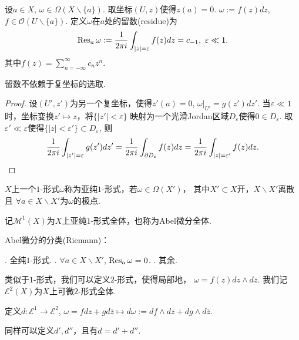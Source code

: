 \begin{definition}
	设$a\in X$, $\omega\in \Omega(X\backslash \{a\})$. 
    取坐标$(U,z)$使得$z(a)=0$. 
    $\omega:=f(z)dz$, $f\in \mathcal{O}(U\backslash\{a\})$. 
    定义$\omega$在$a$处的留数(residue)为
	$$\operatorname{Res}_a \omega:=\frac{1}{2\pi i}\int_{|z|=\varepsilon} f(z)dz=c_{-1}, \ \varepsilon \ll1.$$
	其中$f(z)=\sum\limits_{n=-\infty}^\infty c_nz^n$.
\end{definition}
		
\begin{lemma}
	留数不依赖于复坐标的选取.
\end{lemma}
		
\begin{proof}
	设$(U',z')$为另一个复坐标，使得$z'(a)=0$, $\omega|_{U'}=g(z')dz'$. 
    当$\varepsilon\ll1$时，坐标变换$z'\mapsto z$，将$\{|z'|<\varepsilon\}$
    映射为一个光滑Jordan区域$D_\varepsilon$使得$0\in D_\varepsilon$. 
    取$\varepsilon'\ll\varepsilon$使得$\{|z|<\varepsilon'\}\subset D_\varepsilon$, 则
	$$\frac{1}{2\pi i} \int_{|z'|=\varepsilon} g(z')dz'
    =\frac{1}{2\pi i}\int_{\partial D_{\varepsilon}} f(z)dz
    =\frac{1}{2\pi i} \int_{|z|=\varepsilon'} f(z)dz.\qedhere$$
\end{proof}
	
\begin{definition}
	$X$上一个$1$-形式$\omega$称为亚纯$1$-形式，若$\omega\in \Omega(X')$，
    其中$X'\subset X$开，$X\backslash X'$离散且
    $\forall a\in X\backslash X'$为$\omega$的极点.

	记$\mathscr{M}^1(X)$为$X$上亚纯$1$-形式全体，也称为Abel微分全体.
\end{definition}
		
Abel微分的分类(Riemann)：

	. 全纯$1$-形式. 
    . $\forall a\in X\backslash X'$, $\operatorname{Res}_a \omega=0$. 
    . 其余.

\begin{definition}
	类似于$1$-形式，我们可以定义$2$-形式，使得局部地，
    $\omega=f(z)dz\wedge d\bar{z}$. 
    我们记$\mathcal{E}^2(X)$为$X$上可微$2$-形式全体.
\end{definition}
		
\begin{definition}
	定义$d\colon \mathcal{E}^1\rightarrow \mathcal{E}^2$, 
    $\omega=fdz+gd\bar{z}\mapsto d\omega:=df\wedge dz+dg\wedge d\bar{z}$.

	同样可以定义$d', d''$，且有$d=d'+d''$.
\end{definition}
		
